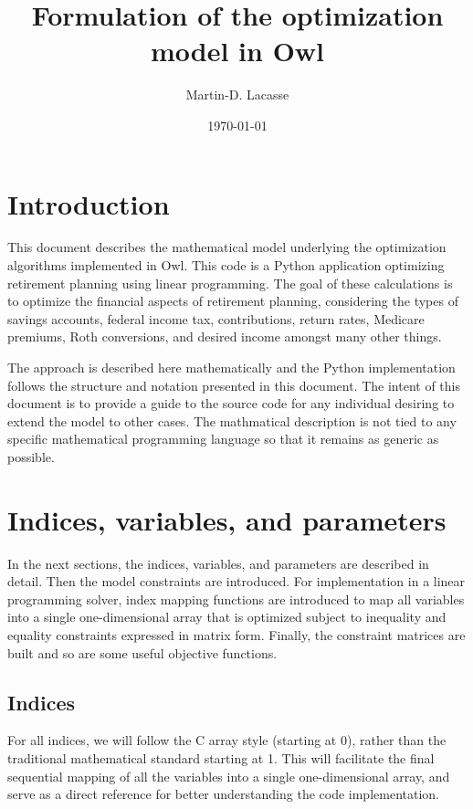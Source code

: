 \documentclass{report}[fleqn,11pt]
\begin{document}
\title{Formulation of the optimization model in Owl}
\author{Martin-D. Lacasse}
\date{\today}
\maketitle
\thispagestyle{fancy}
\fancyhead{}

\chapter{Introduction}
This document describes the mathematical model underlying
the optimization algorithms implemented in
Owl. This code is a Python application optimizing retirement
planning using linear programming. The goal of
these calculations is to optimize the financial aspects
of retirement planning, considering the types of savings accounts,
federal income tax, contributions, return rates, Medicare premiums, Roth conversions,
and desired income amongst many other things.

The approach is described here mathematically and the Python implementation
follows the structure and notation presented in this document.
The intent of this document is to provide a guide to the source code
for any individual desiring to extend the model to other cases.
The mathmatical description is not tied to any specific mathematical
programming language so that it remains as generic as possible.

\chapter{Indices, variables, and parameters}
In the next sections, the indices, variables, and parameters are
described in detail. Then the model constraints are introduced.
For implementation in a linear programming solver, index mapping
functions are introduced to map all variables into a single
one-dimensional array that
is optimized subject to inequality and equality constraints
expressed in matrix form. Finally, the constraint matrices are built
and so are some useful objective functions.

\section{Indices}
For all indices, we will follow the C array style (starting at 0),
rather than the traditional mathematical standard starting at 1.
This will facilitate the final
sequential mapping of all the variables into a single one-dimensional array,
and serve as a direct reference for better understanding the code implementation.
\end{document}
